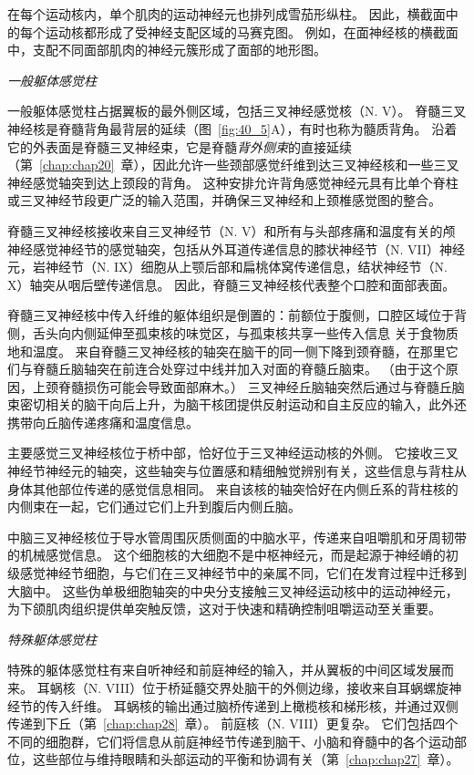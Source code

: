 在每个运动核内，单个肌肉的运动神经元也排列成雪茄形纵柱。
因此，横截面中的每个运动核都形成了受神经支配区域的马赛克图。
例如，在面神经核的横截面中，支配不同面部肌肉的神经元簇形成了面部的地形图。


\textit{一般躯体感觉柱}

一般躯体感觉柱占据翼板的最外侧区域，包括三叉神经感觉核（N. V）。
脊髓三叉神经核是脊髓背角最背层的延续（图~\ref{fig:40_5}A），有时也称为髓质背角。
沿着它的外表面是脊髓三叉神经束，它是脊髓\textit{背外侧束}的直接延续（第~\ref{chap:chap20}~章），因此允许一些颈部感觉纤维到达三叉神经核和一些三叉神经感觉轴突到达上颈段的背角。
这种安排允许背角感觉神经元具有比单个脊柱或三叉神经节段更广泛的输入范围，并确保三叉神经和上颈椎感觉图的整合。


脊髓三叉神经核接收来自三叉神经节（N. V）和所有与头部疼痛和温度有关的颅神经感觉神经节的感觉轴突，包括从外耳道传递信息的膝状神经节（N. VII）神经元，岩神经节（N. IX）细胞从上颚后部和扁桃体窝传递信息，结状神经节（N. X）轴突从咽后壁传递信息。
因此，脊髓三叉神经核代表整个口腔和面部表面。


脊髓三叉神经核中传入纤维的躯体组织是倒置的：前额位于腹侧，口腔区域位于背侧，舌头向内侧延伸至孤束核的味觉区，与孤束核共享一些传入信息 关于食物质地和温度。
来自脊髓三叉神经核的轴突在脑干的同一侧下降到颈脊髓，在那里它们与脊髓丘脑轴突在前连合处穿过中线并加入对面的脊髓丘脑束。
（由于这个原因，上颈脊髓损伤可能会导致面部麻木。）
三叉神经丘脑轴突然后通过与脊髓丘脑束密切相关的脑干向后上升，为脑干核团提供反射运动和自主反应的输入，此外还携带向丘脑传递疼痛和温度信息。


主要感觉三叉神经核位于桥中部，恰好位于三叉神经运动核的外侧。
它接收三叉神经节神经元的轴突，这些轴突与位置感和精细触觉辨别有关，这些信息与背柱从身体其他部位传递的感觉信息相同。
来自该核的轴突恰好在内侧丘系的背柱核的内侧束在一起，它们通过它们上升到腹后内侧丘脑。


中脑三叉神经核位于导水管周围灰质侧面的中脑水平，传递来自咀嚼肌和牙周韧带的机械感觉信息。
这个细胞核的大细胞不是中枢神经元，而是起源于神经嵴的初级感觉神经节细胞，与它们在三叉神经节中的亲属不同，它们在发育过程中迁移到大脑中。
这些伪单极细胞轴突的中央分支接触三叉神经运动核中的运动神经元，为下颌肌肉组织提供单突触反馈，这对于快速和精确控制咀嚼运动至关重要。


\textit{特殊躯体感觉柱}

特殊的躯体感觉柱有来自听神经和前庭神经的输入，并从翼板的中间区域发展而来。
耳蜗核（N. VIII）位于桥延髓交界处脑干的外侧边缘，接收来自耳蜗螺旋神经节的传入纤维。
耳蜗核的输出通过脑桥传递到上橄榄核和梯形核，并通过双侧传递到下丘（第~\ref{chap:chap28}~章）。
前庭核（N. VIII）更复杂。
它们包括四个不同的细胞群，它们将信息从前庭神经节传递到脑干、小脑和脊髓中的各个运动部位，这些部位与维持眼睛和头部运动的平衡和协调有关（第~\ref{chap:chap27}~章）。


